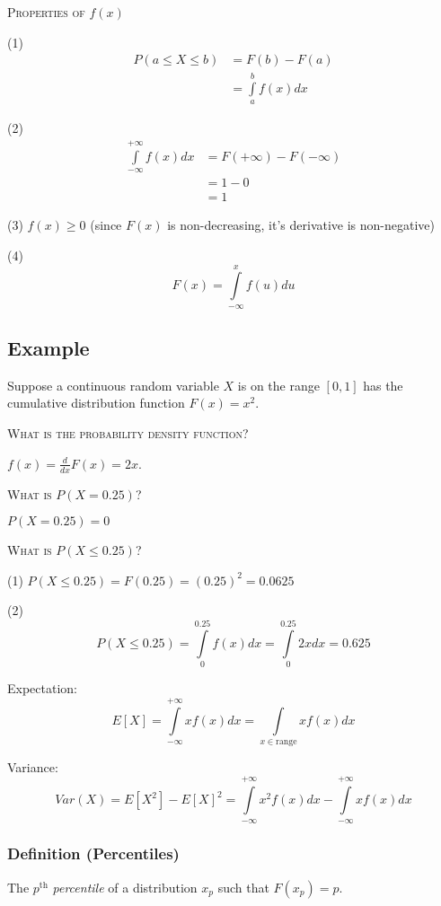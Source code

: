 \textsc{Properties of $ f(x) $}

(1)
\begin{align*}
    P(a\le X\le b)&=F(b)-F(a)\\
    &=\int\limits_{a}^{b} f(x) d{x}
\end{align*}

(2)
\begin{align*}
    \int\limits_{-\infty}^{+\infty} f(x) d{x}&=F(+\infty)-F(-\infty)\\
    &=1-0\\
    &=1
\end{align*}

(3) $ f(x)\ge 0 $ (since $ F(x) $ is non-decreasing, it's derivative is non-negative)

(4) \[ F(x)=\int\limits_{-\infty}^{x} f(u) d{u} \]

\subsection{Example}
Suppose a continuous random variable $ X $ is on the range $ [0,1] $ has the 
cumulative distribution function $ F(x)=x^2 $.

\textsc{What is the probability density function?}

$ f(x)=\frac{d}{dx} F(x)=2x $.

\textsc{What is $ P(X=0.25) $?}

$ P(X=0.25)=0 $

\textsc{What is $ P(X\le 0.25) $?}

(1) $ P(X\le 0.25)=F(0.25)=(0.25)^2=0.0625 $

(2)
\[  P(X\le 0.25)=
\int\limits_{0}^{0.25} f(x) d{x} =\int\limits_{0}^{0.25} 2x d{x} =0.625 \]

\begin{defbox}
    Expectation:
    \[ E[X]=\int\limits_{-\infty}^{+\infty} xf(x) d{x} =
    \int\limits_{x\in\text{range}}^{} xf(x) d{x}  \]
\end{defbox}

\begin{defbox}
    Variance:
    \[ Var(X)=E[X^2]-E[X]^2=\int\limits_{-\infty}^{+\infty} x^2f(x) d{x}-
    \int\limits_{-\infty}^{+\infty} xf(x) d{x} \]
\end{defbox}

\begin{defbox}
    \subsubsection{Definition (Percentiles)}
    The $ p^\text{th} $ \emph{percentile} of a distribution $ x_p $ such that
    $ F(x_p)=p $.
\end{defbox}